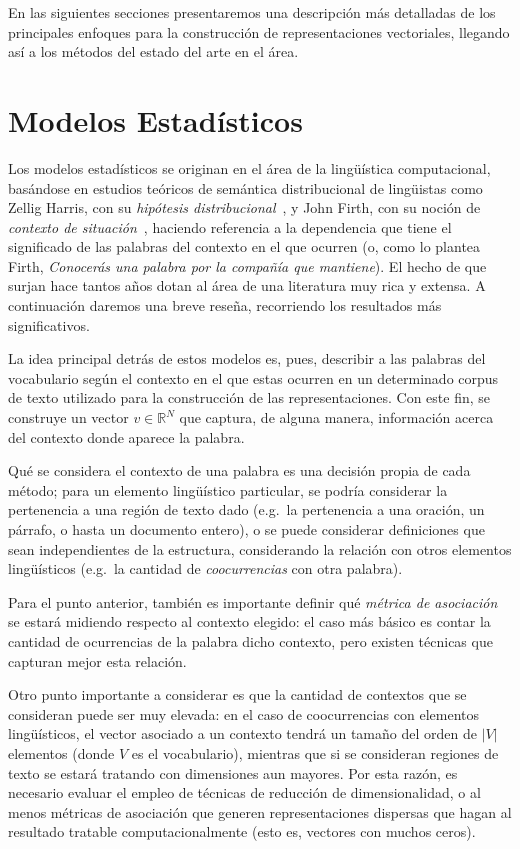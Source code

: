 En las siguientes secciones presentaremos una descripción más detalladas de los principales enfoques
para la construcción de representaciones vectoriales, llegando así a los métodos del estado del arte
en el área.


\section{Modelos Estadísticos}

Los modelos estadísticos se originan en el área de la lingüística computacional, basándose en
estudios teóricos de semántica distribucional de lingüistas como Zellig Harris, con su
\textit{hipótesis distribucional}~\cite{Harris1954}, y John Firth, con su noción de \textit{contexto de
situación}~\cite{Firth1957}, haciendo referencia a la dependencia que tiene el significado de las
palabras del contexto en el que ocurren (o, como lo plantea Firth, \textit{Conocerás una palabra por
la compañía que mantiene}). El hecho de que surjan hace tantos años dotan al área de una literatura
muy rica y extensa. A continuación daremos una breve reseña, recorriendo los resultados más
significativos.

La idea principal detrás de estos modelos es, pues, describir a las palabras del vocabulario según
el contexto en el que estas ocurren en un determinado corpus de texto utilizado para la construcción
de las representaciones. Con este fin, se construye un vector $v \in \mathbb{R}^N$ que captura, de
alguna manera, información acerca del contexto donde aparece la palabra.

Qué se considera el contexto de una palabra es una decisión propia de cada método; para un elemento
lingüístico particular, se podría considerar la pertenencia a una región de texto dado (e.g.\ la
pertenencia a una oración, un párrafo, o hasta un documento entero), o se puede considerar
definiciones que sean independientes de la estructura, considerando la relación con otros elementos
lingüísticos (e.g.\ la cantidad de \textit{coocurrencias} con otra palabra).

Para el punto anterior, también es importante definir qué \textit{métrica de asociación} se estará
midiendo respecto al contexto elegido: el caso más básico es contar la cantidad de ocurrencias de la
palabra dicho contexto, pero existen técnicas que capturan mejor esta relación.

Otro punto importante a considerar es que la cantidad de contextos que se consideran puede ser muy
elevada: en el caso de coocurrencias con elementos lingüísticos, el vector asociado a un contexto
tendrá un tamaño del orden de $|V|$ elementos (donde $V$ es el vocabulario), mientras que si se
consideran regiones de texto se estará tratando con dimensiones aun mayores. Por esta razón, es
necesario evaluar el empleo de técnicas de reducción de dimensionalidad, o al menos métricas de
asociación que generen representaciones dispersas que hagan al resultado tratable computacionalmente
(esto es, vectores con muchos ceros).


